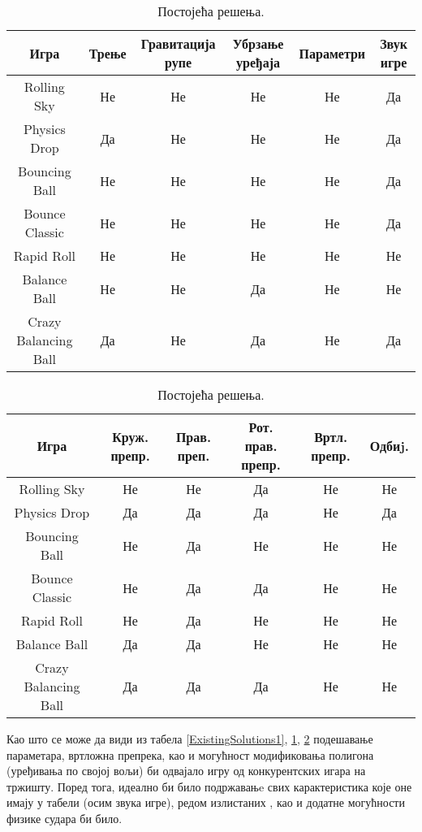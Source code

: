 \begin{table}[H]
\begin{tabular}{|c|c|c|c|c|c|}
\hline
Игра & Трење & Гравитација рупе& Убрзање уређаја& Параметри& Звук игре \\
\hline
Rolling Sky & Не & Не &  Не& Не&Да\\
Physics Drop & Да & Не &  Не & Не&Да\\
Bouncing Ball  & Не & Не&  Не& Не&Да\\
Bounce Classic  & Не & Не &  Не& Не&Да\\
Rapid Roll & Не & Не&  Не& Не&Не\\
Balance Ball  & Не & Не&  Да &Не&Не\\
Crazy Balancing Ball & Да & Не&  Да &Не&Да\\

\hline
\end{tabular}

\caption{Постојећа решења.} \label{ExistingSolutions2}
\end{table}



\begin{table}[H]
\begin{tabular}{|c|c|c|c|c|c|}
\hline
Игра & Круж. препр.& Прав. преп.& Рот. прав. препр.& Вртл. препр.& Одбиj.\\
\hline
Rolling Sky  & Не & Не &  Да&Не&Не\\
Physics Drop  & Да & Да &  Да & Не&Да\\
Bouncing Ball & Не & Да&  Не& Не&Не\\
Bounce Classic & Не & Да &  Да& Не&Не\\
Rapid Roll  & Не & Да&  Не& Не&Не\\
Balance Ball& Да & Да&  Не &Не&Не\\
Crazy Balancing Ball & Да & Да&  Да &Не&Не\\

\hline
\end{tabular}

\caption{Постојећа решења.} \label{ExistingSolutions3}
\end{table}


Као што се може да види из табела \ref{ExistingSolutions1}, \ref{ExistingSolutions2}, \ref{ExistingSolutions3} подешавање параметара, вртложна препрека, као и могућност модификовања полигона (уређивања по својој вољи) би одвајало игру од конкурентских игара на тржишту. Поред тога, идеално би било подржавањe свих карактеристика које оне имају у табели (осим звука игре), редом излистаних , као и додатне могућности физике судара би било.

